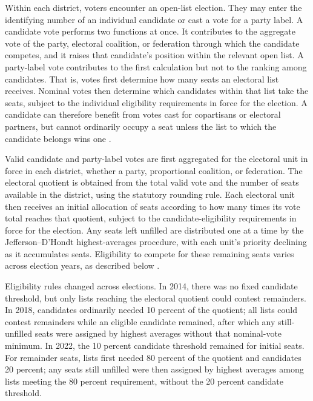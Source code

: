 \documentclass[11pt]{article}
\begin{document}
Within each district, voters encounter an open-list election. They may enter the
identifying number of an individual candidate or cast a vote for a party label.
A candidate vote performs two functions at once. It contributes to the aggregate
vote of the party, electoral coalition, or federation through which the
candidate competes, and it raises that candidate's position within the relevant
open list. A party-label vote contributes to the first calculation but not to
the ranking among candidates. That is, votes first determine how many seats an
electoral list receives. Nominal votes then determine which candidates within
that list take the seats, subject to the individual eligibility requirements in
force for the election. A candidate can therefore benefit from votes cast for
copartisans or electoral partners, but cannot ordinarily occupy a seat unless
the list to which the candidate belongs wins one \parencite{nicolau2006openlist}.

Valid candidate and party-label votes are first aggregated for the electoral
unit in force in each district, whether a party, proportional coalition, or
federation. The electoral quotient is obtained from the total valid vote and the
number of seats available in the district, using the statutory rounding rule.
Each electoral unit then receives an initial allocation of seats according to
how many times its vote total reaches that quotient, subject to the
candidate-eligibility requirements in force for the election. Any seats left
unfilled are distributed one at a time by the Jefferson--D'Hondt
highest-averages procedure, with each unit's priority declining as it
accumulates seats. Eligibility to compete for these remaining seats varies
across election years, as described below \parencite{nicolauSchmitt1995}.

Eligibility rules changed across elections. In 2014, there was no fixed
candidate threshold, but only lists reaching the electoral quotient could
contest remainders. In 2018, candidates ordinarily needed 10 percent of the
quotient; all lists could contest remainders while an eligible candidate
remained, after which any still-unfilled seats were assigned by highest averages
without that nominal-vote minimum. In 2022, the 10 percent candidate threshold
remained for initial seats. For remainder seats, lists first needed 80 percent
of the quotient and candidates 20 percent; any seats still unfilled were then
assigned by highest averages among lists meeting the 80 percent requirement,
without the 20 percent candidate threshold.
\end{document}
